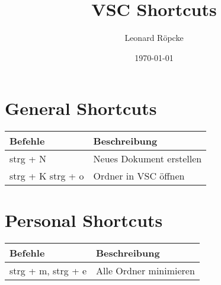 \documentclass[12pt,a4paper]{article}
\title{VSC Shortcuts}
\author{Leonard Röpcke}
\date{\today}
\begin{document}
\maketitle

\begin{center}
    
    \section*{General Shortcuts}
    \begin{tabular}{|p{6cm}||p{6cm}|}
        \hline
        Befehle & Beschreibung \\
        \hline
        strg + N & Neues Dokument erstellen \\
        \hline
        strg + K strg + o & Ordner in VSC öffnen \\
        \hline
    \end{tabular}
    
    
    \section*{Personal Shortcuts}
    \begin{tabular}{|p{6cm}||p{6cm}|}
        \hline
        Befehle & Beschreibung \\
        \hline
        strg + m, strg + e & Alle Ordner minimieren \\
        \hline
    \end{tabular}
    
\end{center}
    
\end{document}
